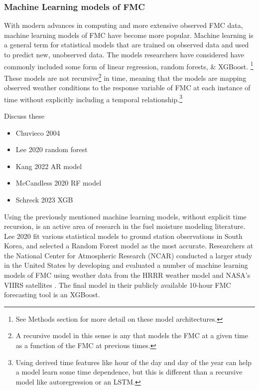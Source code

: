 \documentclass[11pt]{article}%
\begin{document}
\subsubsection{Machine Learning models of FMC}

With modern advances in computing and more extensive observed FMC data, machine learning models of FMC have become more popular. Machine learning is a general term for statistical models that are trained on observed data and used to predict new, unobserved data. The models researchers have considered have commonly included some form of linear regression, random forests, \& XGBoost. \footnote{See Methods section for more detail on these model architectures.} These models are not recursive\footnote{A recursive model in this sense is any that models the FMC at a given time as a function of the FMC at previous times.} in time, meaning that the models are mapping observed weather conditions to the response variable of FMC at each instance of time without explicitly including a temporal relationship.\footnote{Using derived time features like hour of the day and day of the year can help a model learn some time dependence, but this is different than a recursive model like autoregression or an LSTM.} 

Discuss these
\begin{itemize}
    \item Chuvieco 2004 \cite{Chuvieco-2004-CNS}\\
    \item Lee 2020 random forest \cite{Lee-2020-EFM}\\
    \item Kang 2022 AR model \cite{Kang-2022-FMC}\\
    \item McCandless 2020 RF model \cite{McCandless-2020-EWS}\\
    \item Schreck 2023 XGB \cite{Schreck-2023-MLV}
\end{itemize}


Using the previously mentioned machine learning models, without explicit time recursion, is an active area of research in the fuel moisture modeling literature. Lee 2020 fit various statistical models to ground station observations in South Korea, and selected a Random Forest model as the most accurate. \cite{Lee-2020-EFM} Researchers at the National Center for Atmospheric Research (NCAR) conducted a larger study in the United States by developing and evaluated a number of machine learning models of FMC using weather data from the HRRR weather model and NASA's VIIRS satellites \cite{McCandless-2020-EWS}\cite{Schreck-2023-MLV}. The final model in their publicly available 10-hour FMC forecasting tool is an XGBoost. 
\end{document}

